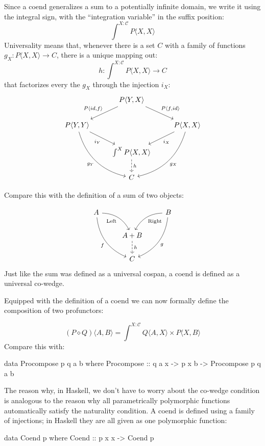 \documentclass[DaoFP]{subfiles}
\begin{document}
Since a coend generalizes a sum to a potentially infinite domain, we write it using the integral sign, with the ``integration variable'' in the suffix position:
\[ \int^{X\colon \mathcal{C}} P \langle X, X \rangle \]
Universality means that, whenever there is a set $C$ with a family of functions $g_X \colon P \langle X, X \rangle \to C$, there is a unique mapping out:
\[ h \colon \int^{X\colon \mathcal{C}} P \langle X, X \rangle \to C \]
that factorizes every the $g_X$ through the injection $i_X$:
\[
 \begin{tikzcd}
 &P \langle Y, X \rangle
 \arrow[ld, "{P \langle id, f \rangle}"']
 \arrow[rd, "{P \langle f, id \rangle}"]
 \\
 P \langle Y, Y \rangle
 \arrow[dr, "i_Y"']
 \arrow[ddr, bend right,  "g_Y"']
 &&P \langle X, X \rangle
 \arrow[dl, "i_X"]
 \arrow[ddl, bend left,  "g_X"]
 \\
 &\int^X P \langle X, X \rangle
 \arrow[d, dashed, "h"]
 \\
 &C
 \end{tikzcd}
\]

Compare this with the definition of a sum of two objects:

\[
 \begin{tikzcd}
 A
 \arrow[dr,  bend left, "\text{Left}"']
 \arrow[ddr, bend right, "f"']
 && B
 \arrow[dl, bend right, "\text{Right}"]
 \arrow[ddl, bend left, "g"]
 \\
&A + B
\arrow[d, dashed, "h"]
\\
& C
 \end{tikzcd}
\]
Just like the sum was defined as a universal cospan, a coend is defined as a universal co-wedge. 

Equipped with the definition of a coend we can now formally define the composition of two profunctors:

\[ (P \diamond Q)\langle A, B \rangle = \int^{X\colon \mathcal{C}} Q \langle A, X \rangle \times P \langle X, B \rangle\]
Compare this with:
\begin{haskell}
data Procompose p q a b where
  Procompose ::  q a x -> p x b -> Procompose p q a b
\end{haskell}

The reason why, in Haskell, we don't have to worry about the co-wedge condition is analogous to the reason why all parametrically polymorphic functions automatically satisfy the naturality condition. A coend is defined using a family of injections; in Haskell they are all given as one polymorphic function:
\begin{haskell}
data Coend p where
  Coend ::  p x x -> Coend p
\end{haskell}
\end{document}
